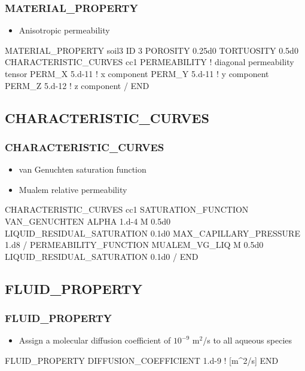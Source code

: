 \documentclass{beamer}
\newcommand\bluecomment[1]{{{\color{blue} #1}}}
\begin{document}
\begin{frame}\frametitle{MATERIAL\_PROPERTY}

\begin{itemize}
  \item Anisotropic permeability
\end{itemize}

\begin{semiverbatim}
MATERIAL_PROPERTY soil3
  ID 3
  POROSITY 0.25d0
  TORTUOSITY 0.5d0
  CHARACTERISTIC_CURVES cc1
  PERMEABILITY        \bluecomment{! diagonal permeability tensor}
    PERM_X 5.d-11     \bluecomment{!   x component}
    PERM_Y 5.d-11     \bluecomment{!   y component}
    PERM_Z 5.d-12     \bluecomment{!   z component}
  /
END
\end{semiverbatim}

\end{frame}

\subsection{CHARACTERISTIC\_CURVES}

\begin{frame}[fragile]\frametitle{CHARACTERISTIC\_CURVES}

\begin{itemize}
\item van Genuchten saturation function
\item Mualem relative permeability
\end{itemize}

\begin{semiverbatim}
CHARACTERISTIC_CURVES cc1
  SATURATION_FUNCTION VAN_GENUCHTEN
    ALPHA  1.d-4
    M 0.5d0
    LIQUID_RESIDUAL_SATURATION 0.1d0
    MAX_CAPILLARY_PRESSURE 1.d8
  /
  PERMEABILITY_FUNCTION MUALEM_VG_LIQ
    M 0.5d0
    LIQUID_RESIDUAL_SATURATION 0.1d0
  /
END
\end{semiverbatim}

\end{frame}

\subsection{FLUID\_PROPERTY}

\begin{frame}\frametitle{FLUID\_PROPERTY}

\begin{itemize}
  \item Assign a molecular diffusion coefficient of $10^{-9}$ m$^2$/s to all aqueous species
\end{itemize}

\begin{semiverbatim}

FLUID_PROPERTY
  DIFFUSION_COEFFICIENT 1.d-9   \bluecomment{! [m^2/s]}
END
\end{semiverbatim}

\end{frame}
\end{document}
